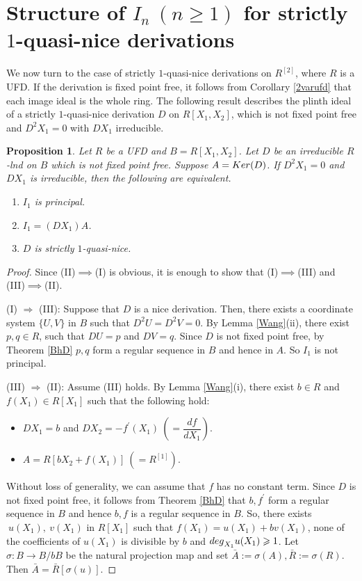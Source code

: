 \documentclass[a4paper,12pt]{article}
\newtheorem{prop}[thm]{Proposition}
\begin{document}
{\section{Structure of $I_n~(n\geqslant 1)$ for strictly $1$-quasi-nice derivations}
We now turn to the case of strictly $1$-quasi-nice derivations on $R^{[2]}$, where $R$ is a UFD. If the derivation is fixed point free, it follows from Corollary \ref{2varufd} that each image ideal is the whole ring. The following result describes the plinth ideal of a strictly $1$-quasi-nice derivation $D$ on $R[X_1,X_2]$, which is not fixed point free and $D^2X_1=0$ with $DX_1$ irreducible.  
\begin{prop}\label{plinth_quasi} Let $R$ be a {\rm UFD} and $B=R[X_1,X_2]$. Let $D$ be an irreducible $R$-lnd on $B$ which is not fixed point free. Suppose $A={\rm Ker}(D)$. If $D^2X_1=0$ and $DX_1$ is irreducible, then the following are equivalent.
\begin{enumerate}
	\item [\rm (I)] $I_1$ is principal.
	\item[\rm (II)] $I_1=(DX_1)A$.
	\item [\rm (III)] $D$ is strictly $1$-quasi-nice.
	
\end{enumerate}
\end{prop}

\begin{proof} Since (II)$\implies$(I) is obvious, it is enough to show that (I)$\implies$(III) and (III)$\implies$(II).

\noindent\medskip
(I) $\Rightarrow$ (III): Suppose that $D$ is a nice derivation. Then, there exists a coordinate system $\{U,V\}$ in $B$ such that $D^2U=D^2V=0$.  By Lemma \ref{Wang}(ii), there exist $p,q \in R$, such that $DU=p$ and $DV=q$. Since $D$ is not fixed point free, by Theorem \ref{BhD} $p,q$ form a regular sequence in $B$ and hence in $A$. So $I_1$ is not principal.

\medskip
\noindent
(III) $\Rightarrow$ (II): Assume (III) holds. By Lemma \ref{Wang}(i), there exist $b\in R$ and $f(X_1)\in{R[X_1]}$ such that the following hold:
\begin{itemize}
	\item $DX_1=b$ and $DX_2=-f^{\prime}(X_1)~(=\dfrac{df}{dX_1})$.
	\item $A=R[bX_2+f(X_1)]~(=R^{[1]})$.
\end{itemize}

\noindent
Without loss of generality, we can assume that $f$ has no constant term. Since $D$ is not fixed point free, it follows from Theorem \ref{BhD} that $b,f^{\prime}$ form a regular sequence in $B$ and hence $b,f$ is a regular sequence in $B$.  So, there exists $~u(X_1),~v(X_1)$ in $R[X_1]$ such that $f(X_1)=u(X_1)+bv(X_1)$, none of the coefficients of $u(X_1)$ is divisible by $b$ and ${\rm deg}_{X_1} u(X_1)\geqslant 1$. Let $\sigma:B\longrightarrow{B/bB}$ be the natural projection map and set $\bar{A}:=\sigma(A), \bar{R}:=\sigma(R)$. Then $\bar{A}=\bar{R}[\sigma(u)]$. 


\end{proof}}
\end{document}
